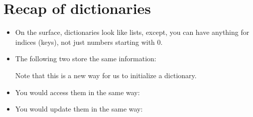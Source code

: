 \documentclass[letterpaper,10pt,english]{sphinxmanual}
\begin{document}
\section{Recap of dictionaries}
\label{\detokenize{lecture_notes/lec17_dictionaries2:recap-of-dictionaries}}\begin{itemize}
\item {} 
On the surface, dictionaries look like lists, except, you can have
anything for indices (keys), not just numbers starting with 0.

\item {} 
The following two store the same information:

%
\begin{sphinxVerbatim}[commandchars=\\\{\}]
  \PYG{p}{[}\PYG{p}{]}
     
\end{sphinxVerbatim}

Note that this is a new way for us to initialize a dictionary.

\item {} 
You would access them in the same way:

%
\begin{sphinxVerbatim}[commandchars=\\\{\}]
\PYG{p}{[}\PYG{p}{]}
\PYG{p}{[}\PYG{p}{]}
\end{sphinxVerbatim}

\item {} 
You would update them in the same way:

%
\begin{sphinxVerbatim}[commandchars=\\\{\}]
\PYG{p}{[}\PYG{p}{]}  
\PYG{p}{[}\PYG{p}{]}  
\end{sphinxVerbatim}


\end{itemize}
\end{document}
